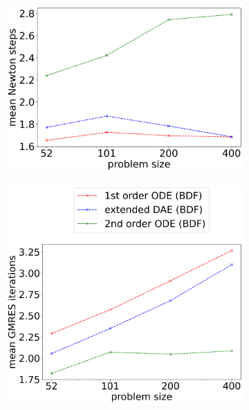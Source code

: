 \begin{figure}[H]
	\centering
	\begin{subfigure}[b]{0.32\textwidth}
		\centering
		\includegraphics[width=1\textwidth]{images/TANDEM_averageNumberNewtonSteps.png}
	\end{subfigure} 
	\begin{subfigure}[b]{0.32\textwidth}
		\centering
		\includegraphics[width=1.03\textwidth]{images/TANDEM_averageNumberKSPIteration.png}

\end{subfigure}
\end{figure}
